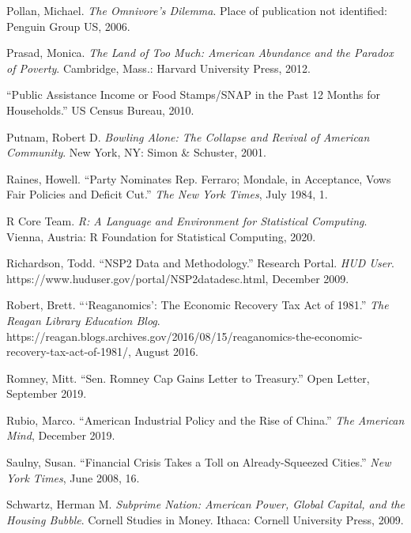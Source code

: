 \documentclass[12pt,oneside]{psthesis}
\begin{document}
\leavevmode\hypertarget{ref-pollan2006omnivore}{}%
Pollan, Michael. \emph{The Omnivore's Dilemma}. Place of publication not identified: Penguin Group US, 2006.

\leavevmode\hypertarget{ref-prasad2012land}{}%
Prasad, Monica. \emph{The Land of Too Much: American Abundance and the Paradox of Poverty}. Cambridge, Mass.: Harvard University Press, 2012.

\leavevmode\hypertarget{ref-2010public}{}%
``Public Assistance Income or Food Stamps/SNAP in the Past 12 Months for Households.'' US Census Bureau, 2010.

\leavevmode\hypertarget{ref-putnam2001bowling}{}%
Putnam, Robert D. \emph{Bowling Alone: The Collapse and Revival of American Community}. New York, NY: Simon \& Schuster, 2001.

\leavevmode\hypertarget{ref-raines1984party}{}%
Raines, Howell. ``Party Nominates Rep. Ferraro; Mondale, in Acceptance, Vows Fair Policies and Deficit Cut.'' \emph{The New York Times}, July 1984, 1.

\leavevmode\hypertarget{ref-rcoreteam2020language}{}%
R Core Team. \emph{R: A Language and Environment for Statistical Computing}. Vienna, Austria: R Foundation for Statistical Computing, 2020.

\leavevmode\hypertarget{ref-richardson2009nsp2}{}%
Richardson, Todd. ``NSP2 Data and Methodology.'' Research Portal. \emph{HUD User}. https://www.huduser.gov/portal/NSP2datadesc.html, December 2009.

\leavevmode\hypertarget{ref-robert2016reaganomics}{}%
Robert, Brett. ```Reaganomics': The Economic Recovery Tax Act of 1981.'' \emph{The Reagan Library Education Blog}. https://reagan.blogs.archives.gov/2016/08/15/reaganomics-the-economic-recovery-tax-act-of-1981/, August 2016.

\leavevmode\hypertarget{ref-romney2019sen}{}%
Romney, Mitt. ``Sen. Romney Cap Gains Letter to Treasury.'' Open Letter, September 2019.

\leavevmode\hypertarget{ref-rubio2019american}{}%
Rubio, Marco. ``American Industrial Policy and the Rise of China.'' \emph{The American Mind}, December 2019.

\leavevmode\hypertarget{ref-saulny2008financial}{}%
Saulny, Susan. ``Financial Crisis Takes a Toll on Already-Squeezed Cities.'' \emph{New York Times}, June 2008, 16.

\leavevmode\hypertarget{ref-schwartz2009subprime}{}%
Schwartz, Herman M. \emph{Subprime Nation: American Power, Global Capital, and the Housing Bubble}. Cornell Studies in Money. Ithaca: Cornell University Press, 2009.
\end{document}
